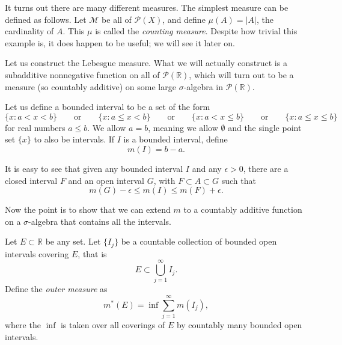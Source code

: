 \documentclass[12pt]{book}
\newcommand{\abs}[1]{\left\lvert {#1} \right\rvert}
\newcommand{\R}{{\mathbb{R}}}
\newcommand{\sM}{{\mathcal{M}}}
\newcommand{\sP}{{\mathcal{P}}}
\theoremstyle{plain}
\theoremstyle{remark}
\theoremstyle{definition}
\theoremstyle{exercise}
\theoremstyle{example}
\begin{document}
\medskip

It turns out there are many different measures.  The simplest measure can be
defined as follows.  Let $\sM$ be all of $\sP(X)$, and define
$\mu(A) = \abs{A}$, the cardinality of $A$.  This $\mu$ is called the
\emph{counting measure}.  Despite how trivial this example
is, it does happen to be useful; we will see it later on.

\medskip

Let us construct the Lebesgue measure.  What we will actually construct
is a subadditive nonnegative function on all of $\sP(\R)$, which will turn out to be a
measure (so countably additive) on some large $\sigma$-algebra in $\sP(\R)$.

\medskip

Let us define a bounded interval to be a set of the form
$$
\{ x : a < x < b \}
\qquad \text{or} \qquad
\{ x : a \leq x < b \}
\qquad \text{or} \qquad
\{ x : a < x \leq b \}
\qquad \text{or} \qquad
\{ x : a \leq x \leq b \}
$$
for real numbers $a \leq b$.  We allow $a = b$, meaning we allow 
$\emptyset$ and the single point set $\{ x \}$ to also be intervals.
If $I$ is a bounded interval, define
$$
m(I) = b-a .
$$

%
%

It is easy to see that given any bounded interval $I$
and any $\epsilon > 0$, there are
a closed interval $F$ and an open interval $G$, with $F \subset A \subset G$
such that
$$
m(G) - \epsilon \leq m(I) \leq m(F) + \epsilon .
$$

Now the point is to show that we can extend $m$ to a countably additive
function on a $\sigma$-algebra that contains all the intervals.%

Let $E \subset \R$ be any set.  Let $\{ I_j \}$ be a countable
collection of bounded open intervals covering $E$,
that is
$$
E \subset \bigcup_{j=1}^\infty I_j .
$$
Define the \emph{outer measure}
as
$$
m^*(E) = \inf \sum_{j=1}^\infty m(I_j) ,
$$
where the $\inf$ is taken over all coverings of $E$ by countably many bounded open
intervals.
\end{document}
